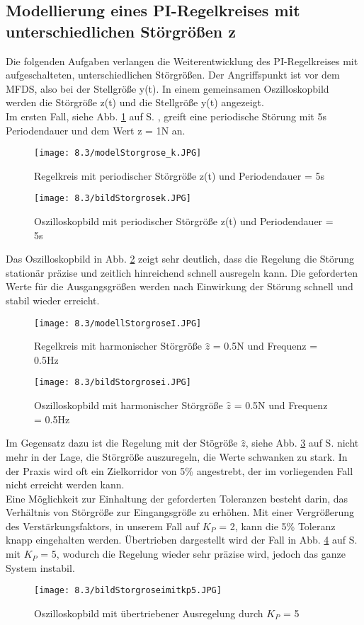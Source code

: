 \documentclass[12pt,a4paper]{scrartcl}	%
\begin{document}
\subsection{Modellierung eines PI-Regelkreises mit unterschiedlichen Störgrößen z}
Die folgenden Aufgaben verlangen die Weiterentwicklung  des PI-Regelkreises mit aufgeschalteten, unterschiedlichen Störgrößen. Der Angriffspunkt ist vor dem MFDS, also bei der Stellgröße y(t). In einem gemeinsamen Oszilloskopbild werden die Störgröße z(t) und die Stellgröße y(t) angezeigt.\\
Im ersten Fall, siehe Abb. \ref{z1} auf S. \pageref{z1}, greift eine periodische Störung mit 5s Periodendauer und dem Wert z = 1N an.\\
\begin{figure}[tbh]
	\centering
	\texttt{[image: 8.3/modelStorgrose\_k.JPG]}
	\caption{Regelkreis mit periodischer Störgröße z(t) und Periodendauer = 5s}
	\label{z1}
\end{figure}
\begin{figure}[tbh]
	\centering
	\texttt{[image: 8.3/bildStorgrosek.JPG]}
	\caption{Oszilloskopbild mit periodischer Störgröße z(t) und Periodendauer = 5s}
	\label{z5}
\end{figure}
Das Oszilloskopbild in Abb. \ref{z5} zeigt sehr deutlich, dass die Regelung die Störung stationär präzise und zeitlich hinreichend schnell ausregeln kann. Die geforderten Werte für die Ausgangsgrößen werden nach Einwirkung der Störung schnell und stabil wieder erreicht.\\
\begin{figure}[tbh]
	\centering
	\texttt{[image: 8.3/modellStorgroseI.JPG]}
	\caption{Regelkreis mit harmonischer Störgröße $\hat{z}$ = 0.5N und Frequenz = 0.5Hz}
\end{figure}
\begin{figure}[tbh]
	\centering
	\texttt{[image: 8.3/bildStorgrosei.JPG]}
	\caption{Oszilloskopbild mit harmonischer Störgröße $\hat{z}$ = 0.5N und Frequenz = 0.5Hz}
	\label{z2}
\end{figure}
Im Gegensatz dazu ist die Regelung mit der Stögröße $\hat{z}$, siehe Abb. \ref{z2} auf S. \pageref{z2} nicht mehr in der Lage, die Störgröße auszuregeln, die Werte schwanken zu stark. In der Praxis wird oft ein Zielkorridor von 5\% angestrebt, der im vorliegenden Fall nicht erreicht werden kann.\\
Eine Möglichkeit zur Einhaltung der geforderten Toleranzen besteht darin, das Verhältnis von Störgröße zur Eingangsgröße zu erhöhen.
Mit einer Vergrößerung des Verstärkungsfaktors, in unserem Fall auf $K_P$ = 2, kann die 5\% Toleranz knapp eingehalten werden. Übertrieben dargestellt wird der Fall in Abb. \ref{z3} auf S. \pageref{z3} mit $K_P$ = 5, wodurch die Regelung wieder sehr präzise wird, jedoch das ganze System instabil.\\
\begin{figure}[tbh]
	\centering
	\texttt{[image: 8.3/bildStorgroseimitkp5.JPG]}
	\caption{Oszilloskopbild mit übertriebener Ausregelung durch $K_P$ = 5}
	\label{z3}
\end{figure}
\clearpage
\end{document}
